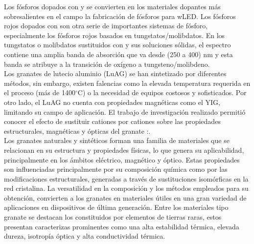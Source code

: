Los fósforos dopados con  y  se convierten en los
materiales dopantes más sobresalientes en el campo la fabricación de fósforos
para wLED. Los fósforos rojos dopados con  son otra serie de
importantes sistemas de fósforo, especialmente los fósforos rojos
basados en tungstatos/molibdatos. En los tungstatos o molibdatos sustituidos
con  y sus soluciones sólidas, el espectro contiene una amplia
banda de absorción que va desde (250 a 400) nm y esta banda se atribuye a la
transición de oxígeno a tungsteno/molibdeno\cite{Kasturi2016,Wu2018}.\\

Los granates de lutecio aluminio (LuAG) se han sintetizado por
diferentes métodos, sin embargo, existen falencias como la elevada temperatura
requerida en el proceso (más de 1400$^{\circ}$C) o la necesidad de equipos costosos y
sofisticados. Por otro lado, el LuAG no cuenta con propiedades magnéticas como
el YIG, limitando su campo de aplicación. El trabajo de investigación realizado
permitió conocer el efecto de sustituir cationes  por cationes  sobre
las propiedades estructurales, magnéticas y ópticas del granate
:.\\

Los granates naturales y sintéticos forman una familia de materiales que
se relacionan en su estructura y propiedades físicas, lo que genera su
aplicabilidad, principalmente en los ámbitos eléctrico, magnético y óptico.
Estas propiedades son influenciadas principalmente por su composición química
como por las modificaciones estructurales, generadas a través de sustituciones
isomórficas en la red cristalina\cite{Chenais2003}. La versatilidad en la
composición y los métodos empleados para su obtención, convierten a los
granates en materiales útiles en una gran variedad de aplicaciones en
dispositivos de última generación. Entre los materiales tipo granate se
destacan los constituidos por elementos de tierras raras, estos presentan
caracterizas prominentes como una alta estabilidad térmica, elevada dureza,
isotropía óptica y alta conductividad térmica\cite{MartinPereda1976,Mari2001,Liu2014,Birkel2012,Heer2002,Malinowski1999}.\\


